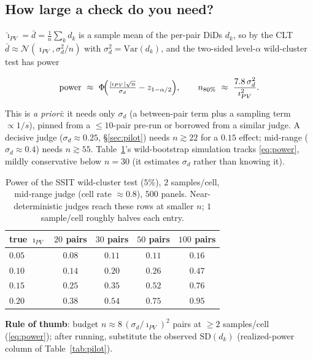 \documentclass{article}
\begin{document}
\subsection{How large a check do you need?}
\label{sec:power}

$\hat\imath_{PV}=\bar d=\tfrac1n\sum_k d_k$ is a sample mean of the
per-pair DiDs $d_k$, so by the CLT
$\bar d\approx\mathcal N(\imath_{PV},\sigma_d^2/n)$ with
$\sigma_d^2=\mathrm{Var}(d_k)$, and the two-sided level-$\alpha$
wild-cluster test has power

\vspace{-0.6em}
\begin{equation}
  \mathrm{power}\ \approx\
  \Phi\!\Bigl(\tfrac{|\imath_{PV}|\sqrt n}{\sigma_d}-z_{1-\alpha/2}\Bigr),
  \qquad
  n_{80\%}\ \approx\ \frac{7.8\,\sigma_d^2}{\imath_{PV}^2}.
  \label{eq:power}
\end{equation}

\noindent This is \emph{a priori}: it needs only $\sigma_d$ (a
between-pair term plus a sampling term $\propto 1/s$), pinned from a
$\leq10$-pair pre-run or borrowed from a similar judge. A decisive
judge ($\sigma_d\approx0.25$, \S\ref{sec:pilot}) needs $n\gtrsim22$
for a $0.15$ effect; mid-range ($\sigma_d\approx0.4$) needs
$n\gtrsim55$. Table~\ref{tab:power}'s wild-bootstrap simulation
tracks \eqref{eq:power}, mildly conservative below $n{=}30$ (it
estimates $\sigma_d$ rather than knowing it).

\begin{table}[htbp]
\centering
\caption{Power of the SSIT wild-cluster test ($5\%$), $2$
samples/cell, mid-range judge (cell rate $\approx0.8$), $500$
panels. Near-deterministic judges reach these rows at smaller $n$;
$1$ sample/cell roughly halves each entry.}
\label{tab:power}
\small
\begin{tabular}{lcccc}
\toprule
true $\imath_{PV}$ & $20$ pairs & $30$ pairs & $50$ pairs & $100$ pairs \\
\midrule
$0.05$ & $0.08$ & $0.11$ & $0.11$ & $0.16$ \\
$0.10$ & $0.14$ & $0.20$ & $0.26$ & $0.47$ \\
$0.15$ & $0.25$ & $0.35$ & $0.52$ & $0.76$ \\
$0.20$ & $0.38$ & $0.54$ & $0.75$ & $0.95$ \\
\bottomrule
\end{tabular}
\end{table}

\noindent \textbf{Rule of thumb}: budget
$n\approx 8\,(\sigma_d/\imath_{PV})^2$ pairs at $\geq2$
samples/cell (\eqref{eq:power}); after running, substitute the
observed $\mathrm{SD}(d_k)$ (realized-power column of
Table~\ref{tab:pilot}).
\end{document}
